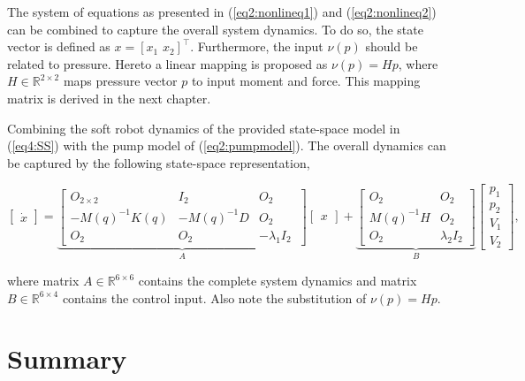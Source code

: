 The system of equations as presented in (\ref{eq2:nonlineq1}) and (\ref{eq2:nonlineq2}) can be combined to capture the overall system dynamics. To do so, the state vector is defined as $x = [x_1 \hspace{4pt} x_2]^\top$. Furthermore, the input $\nu(p)$ should be related to pressure. Hereto a linear mapping is proposed as $\nu(p) = H p$, where $H \in \mathbb{R}^{2\times 2}$ maps pressure vector $p$ to input moment and force. This mapping matrix is derived in the next chapter. 

Combining the soft robot dynamics of the provided state-space model in (\ref{eq4:SS}) with the pump model of (\ref{eq2:pumpmodel}). The overall dynamics can be captured by the following state-space representation,

\begin{equation}
     \begin{bmatrix} \dot{x}  \end{bmatrix}   =   \underbrace{ \begin{bmatrix} O_{2\times 2} & I_{2} & O_{2} \\ -M(q)^{-1}K(q)  & -M(q)^{-1} D & O_{2} \\
     O_{2} & O_{2}    & -\lambda_1 I_{2}\ \end{bmatrix}   }_A   \begin{bmatrix} x \end{bmatrix}  + \underbrace{      \begin{bmatrix} O_{2} & O_{2} \\ M(q)^{-1}H & O_{2} \\ O_{2} & \lambda_2 I_{2} \end{bmatrix} }_B      \begin{bmatrix} p_1 \\ p_2  \\ V_1 \\ V_2 \end{bmatrix},
     \label{eq:ssp}
\end{equation}

where matrix $A \in \mathbb{R}^{6\times 6}$ contains the complete system dynamics and matrix $B \in \mathbb{R}^{6\times 4}$ contains the control input. Also note the substitution of $\nu(p) = Hp$.



\section*{Summary}

